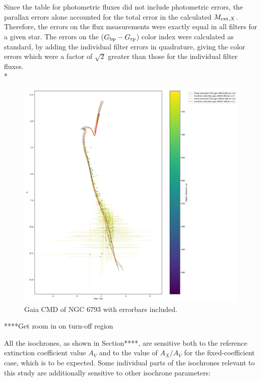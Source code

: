 \documentclass[12pt, a4paper]{report}
\begin{document}
Since the table for photometric fluxes did not include photometric errors, the parallax errors alone accounted for the total error in the calculated $M_{\textnormal{ext},X}$. Therefore, the errors on the flux measurements  were exactly equal in all filters for a given star. The errors on the ($G_{\textnormal{bp}}-G_{\textnormal{rp}}$) color index were calculated as standard, by adding the individual filter errors in quadrature, giving the color errors which were a factor of $\sqrt{2}$ greater than those for the individual filter fluxes.\\*

\begin{figure}[h]
\begin{center}
\includegraphics[scale=0.5]{../NGC_6793_CMD_FeH_0p002_0p198_Av_1p0_600Myr_isochrones_both_errorbars_T5k.pdf}
\caption{Gaia CMD of NGC 6793 with errorbars included.}
\label{ngc_errorbars}
\end{center}
\end{figure}


****Get zoom in on turn-off region

All the isochrones, as shown in Section****, are sensitive both to the reference extinction coefficient value $A_{V}$ and to the value of $A_{X}/A_{V}$ for the fixed-coefficient case, which is to be expected. Some individual parts of the isochrones relevant to this study are additionally sensitive to other isochrone parameters:
\end{document}
